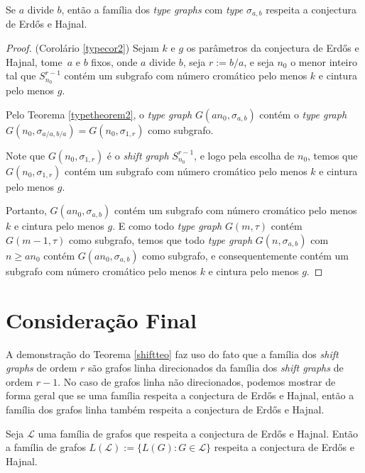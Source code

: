 \begin{corolario}\label{typecor2}
Se $a$ divide $b$, então a família dos \textit{type graphs} com \textit{type} $\sigma_{a,b}$ respeita a conjectura de Erd\H{o}s e Hajnal.
\end{corolario}

\begin{proof}(Corolário \ref{typecor2})
Sejam $k$ e $g$ os parâmetros da conjectura de Erd\H{o}s e Hajnal, tome~$a$ e $b$ fixos, onde $a$ divide $b$, seja $r:= b/a$, e seja $n_0$ o menor inteiro tal que $S_{n_0}^{r-1}$ contém um subgrafo com número cromático pelo menos $k$ e cintura pelo menos $g$.

Pelo Teorema \ref{typetheorem2}, o \textit{type graph} $G(an_0, \sigma_{a,b})$ contém o \textit{type graph} $G(n_0, \sigma_{a/a,b/a}) = G(n_0,\sigma_{1,r})$ como subgrafo.

Note que $G(n_0,\sigma_{1,r})$ é o \textit{shift graph} $S_{n_0}^{r-1}$, e logo pela escolha de $n_0$, temos que $G(n_0,\sigma_{1,r})$ contém um subgrafo com número cromático pelo menos $k$ e cintura pelo menos $g$.

Portanto, $G(an_0, \sigma_{a,b})$ contém um subgrafo com número cromático pelo menos $k$ e cintura pelo menos $g$. E como todo \textit{type graph} $G(m,\tau)$ contém $G(m-1,\tau)$ como subgrafo, temos que todo \textit{type graph} $G(n,\sigma_{a,b})$ com $n \geq an_0$ contém $G(an_0, \sigma_{a,b})$ como subgrafo, e consequentemente contém um subgrafo com número cromático pelo menos $k$ e cintura pelo menos $g$.
\end{proof}

\section{Consideração Final}

A demonstração do Teorema \ref{shiftteo} faz uso do fato que a família dos \textit{shift graphs} de ordem $r$ são grafos linha direcionados da família dos \textit{shift graphs} de ordem $r-1$. No caso de grafos linha não direcionados, podemos mostrar de forma geral que se uma família respeita a conjectura de Erd\H{o}s e Hajnal, então a família dos grafos linha também respeita a conjectura de Erd\H{o}s e Hajnal.

\begin{fato}\label{shiftconsfinal1}
Seja $\mathcal{L}$ uma família de grafos que respeita a conjectura de Erd\H{o}s e Hajnal. Então a família de grafos $L(\mathcal{L}) := \{L(G) : G\in\mathcal{L}\}$ respeita a conjectura de Erd\H{o}s e Hajnal.
\end{fato}


